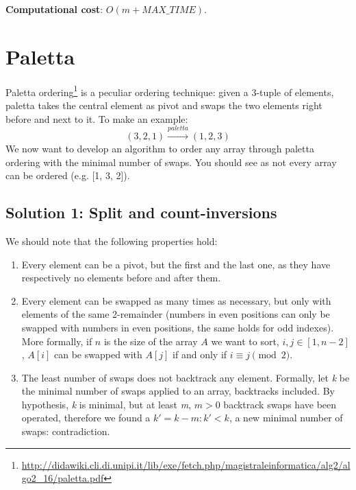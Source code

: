 \documentclass{article}
\begin{document}
\begin{framed}
  \noindent
  \textbf{Computational cost}: $O(m + MAX\_TIME)$.
\end{framed}


\section{Paletta}

Paletta ordering\footnote{\url{http://didawiki.cli.di.unipi.it/lib/exe/fetch.php/magistraleinformatica/alg2/algo2_16/paletta.pdf}}
is a peculiar ordering technique: given a 3-tuple of elements, paletta takes the
central element as pivot and swaps the two elements right before and next to it.
To make an example:
$$(3, 2, 1) \xrightarrow{paletta} (1, 2, 3)$$
We now want to develop an algorithm to order any array through paletta ordering
with the minimal number of swaps.
You should see as not every array can be ordered (e.g. [1, 3, 2]).

\subsection{Solution 1: Split and count-inversions}

We should note that the following properties hold:
\begin{enumerate}
    \item Every element can be a pivot, but the first and the last one, as they
    have respectively no elements before and after them.
    \item Every element can be swapped as many times as necessary, but only with
    elements of the same 2-remainder (numbers in even positions can only be
    swapped with numbers in even positions, the same holds for odd indexes).
    More formally, if $n$ is the size of the array $A$ we want to sort,
    $i,j \in [1, n - 2]$, $A[i]$ can be swapped with $A[j]$ if and only if $i \equiv j \pmod{2}$.
    \item The least number of swaps does not backtrack any element.
    Formally, let \emph{k} be the minimal number of swaps applied to an array,
    backtracks included. By hypothesis, \emph{k} is minimal, but at least \emph{m},
    $m > 0$ backtrack swaps have been operated, therefore we found a
    $k' = k - m: k' < k$, a new minimal number of swaps: contradiction.
\end{enumerate}
\end{document}
